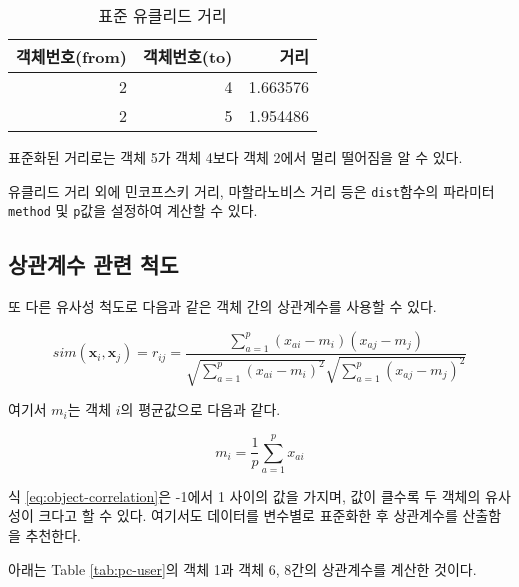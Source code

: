 \documentclass[
]{book}
\begin{document}
\begin{table}

\caption{\label{tab:std-euclidean-dist}표준 유클리드 거리}
\centering
\begin{tabular}[t]{rrr}
\toprule
객체번호(from) & 객체번호(to) & 거리\\
\midrule
2 & 4 & 1.663576\\
2 & 5 & 1.954486\\
\bottomrule
\end{tabular}
\end{table}

표준화된 거리로는 객체 5가 객체 4보다 객체 2에서 멀리 떨어짐을 알 수 있다.

유클리드 거리 외에 민코프스키 거리, 마할라노비스 거리 등은 \texttt{dist}함수의 파라미터 \texttt{method} 및 \texttt{p}값을 설정하여 계산할 수 있다.

\hypertarget{object-correlation-metric}{%
\subsection{상관계수 관련 척도}\label{object-correlation-metric}}

또 다른 유사성 척도로 다음과 같은 객체 간의 상관계수를 사용할 수 있다.

\begin{equation}
sim(\mathbf{x}_i, \mathbf{x}_j) = r_{ij} = \frac{\sum_{a = 1}^{p} (x_{ai} - m_{i})(x_{aj} - m_{j})}{\sqrt{\sum_{a = 1}^{p} (x_{ai} - m_{i})^2} \sqrt{\sum_{a = 1}^{p} (x_{aj} - m_{j})^2}}
\label{eq:object-correlation}
\end{equation}

여기서 \(m_i\)는 객체 \(i\)의 평균값으로 다음과 같다.

\begin{equation*}
m_{i} = \frac{1}{p} \sum_{a = 1}^{p} x_{ai}
\end{equation*}

식 \eqref{eq:object-correlation}은 -1에서 1 사이의 값을 가지며, 값이 클수록 두 객체의 유사성이 크다고 할 수 있다. 여기서도 데이터를 변수별로 표준화한 후 상관계수를 산출함을 추천한다.

아래는 Table \ref{tab:pc-user}의 객체 1과 객체 6, 8간의 상관계수를 계산한 것이다.
\end{document}

